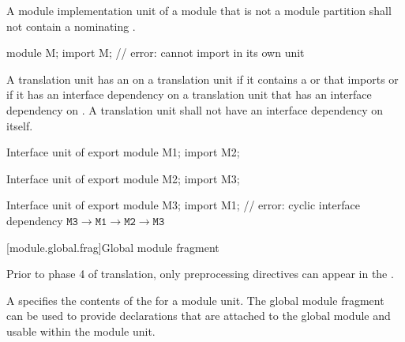 \pnum
A module implementation unit of a module 
that is not a module partition
shall not contain a 
nominating .
\begin{example}
\begin{codeblock}
module M;
import M;               // error: cannot import  in its own unit
\end{codeblock}
\end{example}

\pnum
A translation unit has an  on a translation unit 
if it contains a  or
 that imports  or if it has
an interface dependency on a translation unit that has an interface dependency on .
A translation unit shall not have an interface dependency on itself.
\begin{example}
\begin{codeblocktu}{Interface unit of }
export module M1;
import M2;
\end{codeblocktu}

\begin{codeblocktu}{Interface unit of }
export module M2;
import M3;
\end{codeblocktu}

\begin{codeblocktu}{Interface unit of }
export module M3;
import M1;              // error: cyclic interface dependency $\mathtt{M3} \rightarrow \mathtt{M1} \rightarrow \mathtt{M2} \rightarrow \mathtt{M3}$
\end{codeblocktu}
\end{example}

[module.global.frag]{Global module fragment}

\begin{bnf}
\br
     \terminal{;} 
\end{bnf}

\pnum
\begin{note}
Prior to phase 4 of translation,
only preprocessing directives can appear
in the .
\end{note}

\pnum
A  specifies the contents of the
 for a module unit.
The global module fragment can be used to provide declarations
that are attached to the global module and usable within the module unit.

